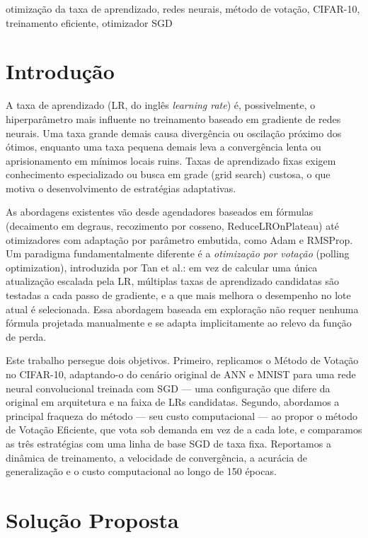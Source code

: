 \documentclass[conference]{IEEEtran}
\begin{document}
\begin{IEEEkeywords}
otimização da taxa de aprendizado, redes neurais, método de votação, CIFAR-10, treinamento eficiente, otimizador SGD
\end{IEEEkeywords}

\section{Introdução}

A taxa de aprendizado (LR, do inglês \emph{learning rate}) é, possivelmente, o hiperparâmetro mais influente no treinamento baseado em gradiente de redes neurais. Uma taxa grande demais causa divergência ou oscilação próximo dos ótimos, enquanto uma taxa pequena demais leva a convergência lenta ou aprisionamento em mínimos locais ruins. Taxas de aprendizado fixas exigem conhecimento especializado ou busca em grade (grid search) custosa, o que motiva o desenvolvimento de estratégias adaptativas.

As abordagens existentes vão desde agendadores baseados em fórmulas (decaimento em degraus, recozimento por cosseno, ReduceLROnPlateau) até otimizadores com adaptação por parâmetro embutida, como Adam e RMSProp. Um paradigma fundamentalmente diferente é a \emph{otimização por votação} (polling optimization), introduzida por Tan et al.: em vez de calcular uma única atualização escalada pela LR, múltiplas taxas de aprendizado candidatas são testadas a cada passo de gradiente, e a que mais melhora o desempenho no lote atual é selecionada. Essa abordagem baseada em exploração não requer nenhuma fórmula projetada manualmente e se adapta implicitamente ao relevo da função de perda.

Este trabalho persegue dois objetivos. Primeiro, replicamos o Método de Votação no CIFAR-10, adaptando-o do cenário original de ANN e MNIST para uma rede neural convolucional treinada com SGD --- uma configuração que difere da original em arquitetura e na faixa de LRs candidatas. Segundo, abordamos a principal fraqueza do método --- seu custo computacional --- ao propor o método de Votação Eficiente, que vota sob demanda em vez de a cada lote, e comparamos as três estratégias com uma linha de base SGD de taxa fixa. Reportamos a dinâmica de treinamento, a velocidade de convergência, a acurácia de generalização e o custo computacional ao longo de 150 épocas.

\section{Solução Proposta}
\end{document}
